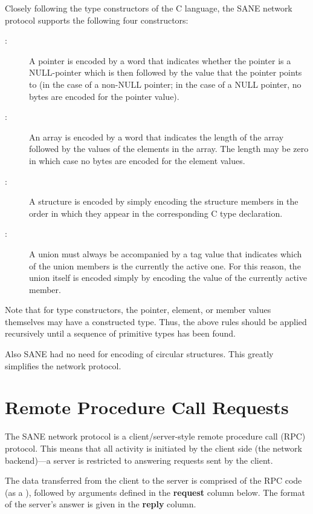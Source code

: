 Closely following the type constructors of the C language, the SANE network
protocol supports the following four constructors:
\begin{description}

\item[{\em{}}:] A pointer is encoded by a word that indicates
  whether the pointer is a NULL-pointer which is then followed by the
  value that the pointer points to (in the case of a non-NULL pointer;
  in the case of a NULL pointer, no bytes are encoded for the pointer
  value).

\item[{\em{}}:] An array is encoded by a word that indicates
  the length of the array followed by the values of the elements in
  the array.  The length may be zero in which case no bytes are
  encoded for the element values.

\item[{\em{}}:] A structure is encoded by simply encoding the
  structure members in the order in which they appear in the
  corresponding C type declaration.

\item[{\em{}}:] A union must always be accompanied by a tag
  value that indicates which of the union members is the currently the
  active one.  For this reason, the union itself is encoded simply by
  encoding the value of the currently active member.

\end{description}

Note that for type constructors, the pointer, element, or member
values themselves may have a constructed type.  Thus, the above rules
should be applied recursively until a sequence of primitive types has
been found.

Also SANE had no need for encoding of circular structures.  This
greatly simplifies the network protocol.

\section{Remote Procedure Call Requests}

The SANE network protocol is a client/server-style remote procedure
call (RPC) protocol.  This means that all activity is initiated by the
client side (the network backend)---a server is restricted to
answering requests sent by the client.

The data transferred from the client to the server is comprised of the RPC code
(as a ), followed by arguments defined in the {\bf request}
column below.  The format of the server's answer is given in the {\bf reply}
column.

